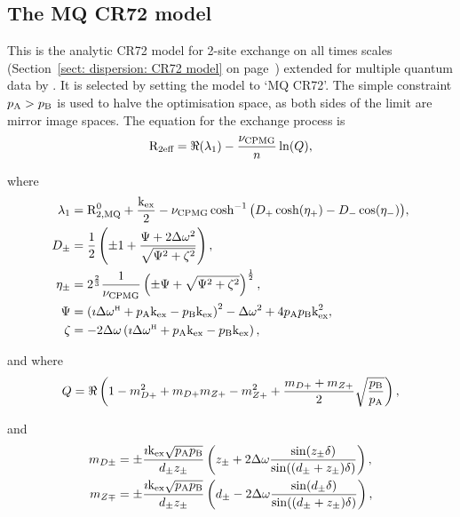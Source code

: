
\subsection{The MQ CR72 model}
\label{sect: dispersion: MQ CR72 model}

This is the analytic CR72 model for 2-site exchange on all times scales (Section~\ref{sect: dispersion: CR72 model} on page~\pageref{sect: dispersion: CR72 model}) extended for multiple quantum data by \citet{Korzhnev04a}.
It is selected by setting the model to `MQ CR72'.
The simple constraint $p_\textrm{A} > p_\textrm{B}$ is used to halve the optimisation space, as both sides of the limit are mirror image spaces.
The equation for the exchange process is 
\begin{equation}
    \mathrm{R}_\textrm{2eff} = \Re(\lambda_1) - \frac{\nu_\textrm{CPMG}}{n}\ln(Q),
\end{equation}

where
\begin{align}
    \lambda_1 &= \mathrm{R}_\mathrm{2,MQ}^0 + \frac{\textrm{k}_\textrm{ex}}{2} - \nu_\textrm{CPMG}\cosh^{-1} \big( D_+\cosh(\eta_+) - D_-\cos(\eta_-) \big), \\
    D_\pm     &= \frac{1}{2} \left( \pm1 + \frac{\Psi + 2\Delta\omega^2}{\sqrt{\Psi^2 + \zeta^2}} \right) , \\
    \eta_\pm  &= 2^{\frac{2}{3}}\frac{1}{\nu_\textrm{CPMG}} \left( \pm\Psi + \sqrt{\Psi^2 + \zeta^2} \right)^{\frac{1}{2}} , \\
    \Psi      &= \left( \imath \Delta\omega^{\scriptscriptstyle\mathrm{H}} + p_\textrm{A}\textrm{k}_\textrm{ex} - p_\textrm{B}\textrm{k}_\textrm{ex} \right)^2 - \Delta\omega^2 + 4p_\textrm{A}p_\textrm{B}\textrm{k}_\textrm{ex}^2 , \\
    \zeta     &= -2\Delta\omega \left( \imath \Delta\omega^{\scriptscriptstyle\mathrm{H}} + p_\textrm{A}\textrm{k}_\textrm{ex} - p_\textrm{B}\textrm{k}_\textrm{ex} \right),
\end{align}

and where
\begin{equation}
    Q = \Re \left( 1 - m_{D+}^2 + m_{D+} m_{Z+} - m_{Z+}^2 + \frac{m_{D+} + m_{Z+}}{2} \sqrt{\frac{p_\textrm{B}}{p_\textrm{A}}} \right),
\end{equation}

and
\begin{align}
    m_{D\pm} &= \pm \frac{\imath\textrm{k}_\textrm{ex}\sqrt{p_\textrm{A}p_\textrm{B}}}{d_\pm z_\pm} \left( z_\pm + 2\Delta\omega \frac{\sin(z_\pm\delta)}{\sin((d_\pm + z_\pm)\delta)} \right), \\
    m_{Z\mp} &= \pm \frac{\imath\textrm{k}_\textrm{ex}\sqrt{p_\textrm{A}p_\textrm{B}}}{d_\pm z_\pm} \left( d_\pm - 2\Delta\omega \frac{\sin(d_\pm\delta)}{\sin((d_\pm + z_\pm)\delta)} \right),
\end{align}

